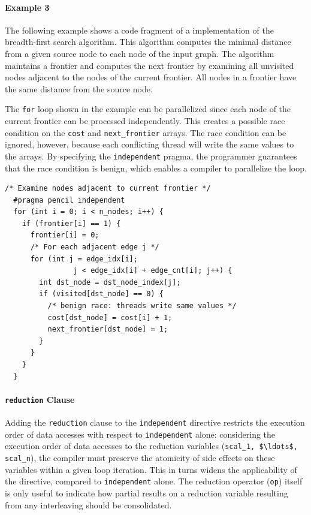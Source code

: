 \paragraph{Example 3}
  The following example shows a code fragment of a \pencil
  implementation of the breadth-first search algorithm.
  This algorithm computes the minimal distance from a given source node to
  each node of the input graph.
  The algorithm maintains a frontier and computes the next frontier by examining
  all unvisited nodes adjacent to the nodes of the current frontier.
  All nodes in a frontier have the same distance from the source node.

  The \lstinline|for| loop shown in the example can be
  parallelized since each node of the current frontier can be processed
  independently.
  This creates a possible race condition on the \lstinline|cost| and
  \lstinline|next_frontier| arrays.
  The race condition can be ignored, however, because each conflicting thread
  will write the same values to the arrays.
  By specifying the \lstinline|independent| pragma, the programmer guarantees
  that the race condition is benign, which enables a \pencil compiler to
  parallelize the loop.

  \begin{lstlisting}[language=pencil]
  /* Examine nodes adjacent to current frontier */
  #pragma pencil independent
  for (int i = 0; i < n_nodes; i++) {
    if (frontier[i] == 1) {
      frontier[i] = 0;
      /* For each adjacent edge j */
      for (int j = edge_idx[i];
                j < edge_idx[i] + edge_cnt[i]; j++) {
        int dst_node = dst_node_index[j];
        if (visited[dst_node] == 0) {
          /* benign race: threads write same values */
          cost[dst_node] = cost[i] + 1;
          next_frontier[dst_node] = 1;
        }
      }
    }
  }
  \end{lstlisting}
  
  \paragraph{\lstinline!reduction! Clause}
  \label{reduction-clause}

  Adding the \lstinline!reduction! clause to the \lstinline!independent!
  directive restricts the execution order of data accesses with respect
  to \lstinline!independent! alone: considering 
  the execution order of data accesses to the reduction variables
  (\lstinline!scal_1, $\ldots$, scal_n!), the compiler must preserve
  the atomicity of side effects on these variables within a given
  loop iteration.
  This in turns widens the applicability of the directive, compared to
  \lstinline!independent! alone.
  The reduction operator (\lstinline!op!) itself is only useful to
  indicate how partial results on a reduction variable resulting from
  any interleaving should be consolidated.

